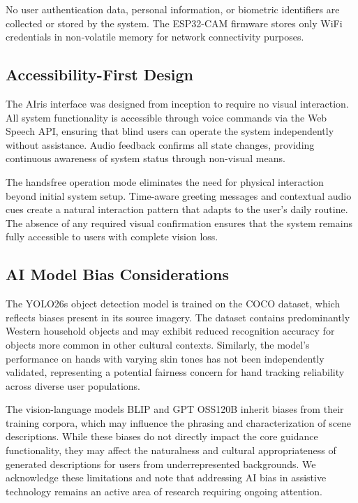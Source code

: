 \documentclass[12pt,a4paper]{report}
\begin{document}
No user authentication data, personal information, or biometric identifiers are collected or stored by the system. The ESP32-CAM firmware stores only WiFi credentials in non-volatile memory for network connectivity purposes.

\subsection{Accessibility-First Design}

The AIris interface was designed from inception to require no visual interaction. All system functionality is accessible through voice commands via the Web Speech API, ensuring that blind users can operate the system independently without assistance. Audio feedback confirms all state changes, providing continuous awareness of system status through non-visual means.

The handsfree operation mode eliminates the need for physical interaction beyond initial system setup. Time-aware greeting messages and contextual audio cues create a natural interaction pattern that adapts to the user's daily routine. The absence of any required visual confirmation ensures that the system remains fully accessible to users with complete vision loss.

\subsection{AI Model Bias Considerations}

The YOLO26s object detection model is trained on the COCO dataset, which reflects biases present in its source imagery. The dataset contains predominantly Western household objects and may exhibit reduced recognition accuracy for objects more common in other cultural contexts. Similarly, the model's performance on hands with varying skin tones has not been independently validated, representing a potential fairness concern for hand tracking reliability across diverse user populations.

The vision-language models BLIP and GPT OSS120B inherit biases from their training corpora, which may influence the phrasing and characterization of scene descriptions. While these biases do not directly impact the core guidance functionality, they may affect the naturalness and cultural appropriateness of generated descriptions for users from underrepresented backgrounds. We acknowledge these limitations and note that addressing AI bias in assistive technology remains an active area of research requiring ongoing attention.
\end{document}
